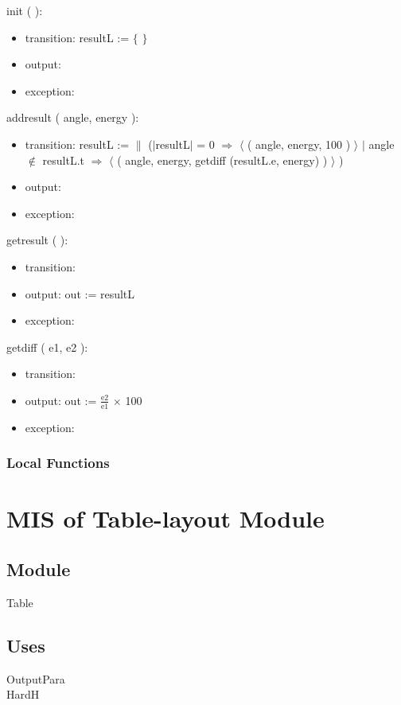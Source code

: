 \documentclass[12pt, titlepage]{article}
\begin{document}
\noindent  init ( ):
\begin{itemize}
\item transition: resultL := $\{ $ $ \}$
\item output:
\item exception: 
\end{itemize}

\noindent  addresult ( angle, energy ):
\begin{itemize}
\item transition: resultL := $\|$ ($|$resultL$|$ = 0 $\Rightarrow$ $\langle$ ( angle, energy, 100 )  $\rangle$ $|$ angle $\notin$ resultL.t $\Rightarrow$ $\langle$ ( angle, energy, getdiff (resultL.e, energy) )  $\rangle$ )
\item output:
\item exception: 
\end{itemize}

\noindent  getresult (  ):
\begin{itemize}
\item transition: 
\item output: out := resultL
\item exception: 
\end{itemize}

\noindent  getdiff ( e1, e2 ):
\begin{itemize}
\item transition: 
\item output: out :=
\large
$\frac{\text{e2}}{\text{e1}}$ $\times$ 100

\item exception: 
\end{itemize}

\subsubsection{Local Functions}

\section{MIS of Table-layout Module} \label{ModuleTI} 

\subsection{Module}
Table\\

\subsection{Uses}
OutputPara\\
HardH\\
\end{document}

